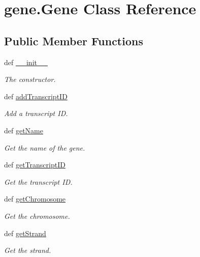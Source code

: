 \hypertarget{classgene_1_1_gene}{\section{gene.\+Gene Class Reference}
\label{classgene_1_1_gene}
}
\subsection*{Public Member Functions}
\begin{DoxyCompactItemize}
\item 
def \hyperlink{classgene_1_1_gene_a83b42158e952b57f232670532e64246c}{\+\_\+\+\_\+init\+\_\+\+\_\+}
\begin{DoxyCompactList}\small\item\em The constructor. \end{DoxyCompactList}\item 
def \hyperlink{classgene_1_1_gene_a022015d0044621d4a0f23f877ecdf41f}{add\+Transcript\+I\+D}
\begin{DoxyCompactList}\small\item\em Add a transcript I\+D. \end{DoxyCompactList}\item 
def \hyperlink{classgene_1_1_gene_a395bb5c95232ee0acabd23487b2e5eac}{get\+Name}
\begin{DoxyCompactList}\small\item\em Get the name of the gene. \end{DoxyCompactList}\item 
def \hyperlink{classgene_1_1_gene_a26bf7de0fc7c79c3716f8514401e4ba0}{get\+Transcript\+I\+D}
\begin{DoxyCompactList}\small\item\em Get the transcript I\+D. \end{DoxyCompactList}\item 
def \hyperlink{classgene_1_1_gene_a5c75d7129fb82095e60697a6ada6af4e}{get\+Chromosome}
\begin{DoxyCompactList}\small\item\em Get the chromosome. \end{DoxyCompactList}\item 
def \hyperlink{classgene_1_1_gene_ad5a8abe5ba76e5ce49ef34a2066a4966}{get\+Strand}
\begin{DoxyCompactList}\small\item\em Get the strand. \end{DoxyCompactList}\item 

\end{DoxyCompactItemize}
